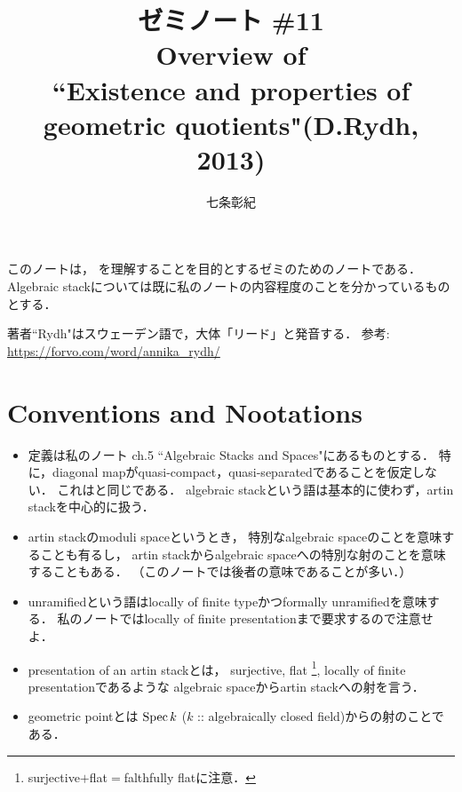 \documentclass[a4paper, dvipdfmx]{jsarticle}
\begin{document}
\title{ゼミノート \#11 \\ Overview of \\ ``Existence and properties of geometric quotients"(D.Rydh, 2013)}
\author{七条彰紀}
\maketitle
\tableofcontents
\vspace{10pt}

このノートは，
\cite{Rydh13}を理解することを目的とするゼミのためのノートである．
Algebraic stackについては既に私のノート\cite{SAAlgSt}の内容程度のことを分かっているものとする．

\begin{Remark}
    著者``Rydh"はスウェーデン語で，大体「リード」と発音する．
    参考: \url{https://forvo.com/word/annika_rydh/}
\end{Remark}

\section*{Conventions and Nootations}
    \begin{itemize}[leftmargin=*]
    \item 
        定義は私のノート\cite{SAAlgSt} ch.5 ``Algebraic Stacks and Spaces"にあるものとする．
        特に，diagonal mapがquasi-compact，quasi-separatedであることを仮定しない．
        これは\cite{Rydh13}と同じである．
        algebraic stackという語は基本的に使わず，artin stackを中心的に扱う．

    \item
        artin stackのmoduli spaceというとき，
        特別なalgebraic spaceのことを意味することも有るし，
        artin stackからalgebraic spaceへの特別な射のことを意味することもある．
        （このノートでは後者の意味であることが多い．）

    \item
        unramifiedという語はlocally of finite typeかつformally unramifiedを意味する．
        私のノートではlocally of finite presentationまで要求するので注意せよ．

    \item
        presentation of an artin stackとは，
        surjective, flat
            \footnote{ surjective$+$flat$=$falthfully flatに注意． },
        locally of finite presentationであるような
        algebraic spaceからartin stackへの射を言う．

    \item
        geometric pointとは
        $\operatorname{Spec} k$ ($k$ :: algebraically closed field)からの射のことである．
    \end{itemize}
\end{document}
